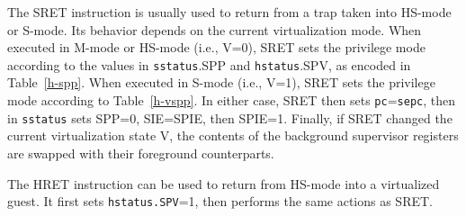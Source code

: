 The SRET instruction is usually used to return from a trap taken into HS-mode or
S-mode.  Its behavior depends on the current virtualization mode.  When
executed in M-mode or HS-mode (i.e., V=0), SRET sets the privilege mode
according to the values in {\tt sstatus}.SPP and {\tt hstatus}.SPV, as encoded
in Table~\ref{h-spp}.  When executed in S-mode (i.e., V=1), SRET sets the
privilege mode according to Table~\ref{h-vspp}.  In either case, SRET then
sets {\tt pc}={\tt sepc}, then in {\tt sstatus} sets SPP=0, SIE=SPIE, then
SPIE=1.  Finally, if SRET changed the current virtualization state V, the
contents of the background supervisor registers are swapped with their
foreground counterparts.

The HRET instruction can be used to return from HS-mode into a virtualized
guest.  It first sets {\tt hstatus.SPV}=1, then performs the same actions as
SRET.
